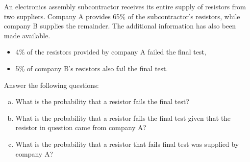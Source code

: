 \documentclass[a4paper,12pt]{article}
\begin{document}

    \item 
An electronics assembly subcontractor receives its entire supply of resistors from two suppliers. Company A provides 65\% of the subcontractor's resistors, while company B supplies the remainder. The additional information has also been made available.
\begin{itemize}
\item 4\% of the resistors provided by company A failed the final test,
\item 5\% of company B's resistors also fail the final test.
\end{itemize}
\noindent Answer the following questions:
\begin{enumerate}[(a)]
\item What is the probability that a resistor fails the final test?
\item  What is the probability that a resistor fails the final test given that the resistor in question came from company A?
\item  What is the probability that a resistor that fails final test was supplied by company A?
\end{enumerate}
\end{document}
